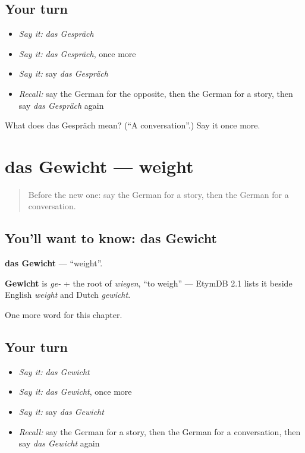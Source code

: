 \subsection*{Your turn}
\begin{itemize}
\raggedright
  \item \emph{Say it:} \emph{das Gespräch}
  \item \emph{Say it:} \emph{das Gespräch}, once more
  \item \emph{Say it:} say \emph{das Gespräch}
  \item \emph{Recall:} say the German for the opposite, then the German for a story, then say \emph{das Gespräch} again
\end{itemize}

\begin{tcolorbox}[breakable,colback=teal!4,colframe=teal!35!black,title={Before you move on}]
What does das Gespräch mean? (\textquotedblleft{}A conversation\textquotedblright{}.) Say it once more.
\end{tcolorbox}
\section[das Gewicht]{das Gewicht — weight}

\label{lesson:GE-C230-gewicht}



\begin{quote}
Before the new one: say the German for a story, then the German for a conversation.
\end{quote}

\subsection*{You'll want to know: das Gewicht}
\textbf{das Gewicht} — \textquotedblleft{}weight\textquotedblright{}.

\begin{cousinweb}
\textbf{Gewicht} is \emph{ge-} + the root of \emph{wiegen}, \textquotedblleft{}to weigh\textquotedblright{} — EtymDB 2.1 lists it beside English \emph{weight} and Dutch \emph{gewicht}.
\end{cousinweb}

\begin{grammarlens}[title={What you've built}]
One more word for this chapter.
\end{grammarlens}

\subsection*{Your turn}
\begin{itemize}
\raggedright
  \item \emph{Say it:} \emph{das Gewicht}
  \item \emph{Say it:} \emph{das Gewicht}, once more
  \item \emph{Say it:} say \emph{das Gewicht}
  \item \emph{Recall:} say the German for a story, then the German for a conversation, then say \emph{das Gewicht} again
\end{itemize}

